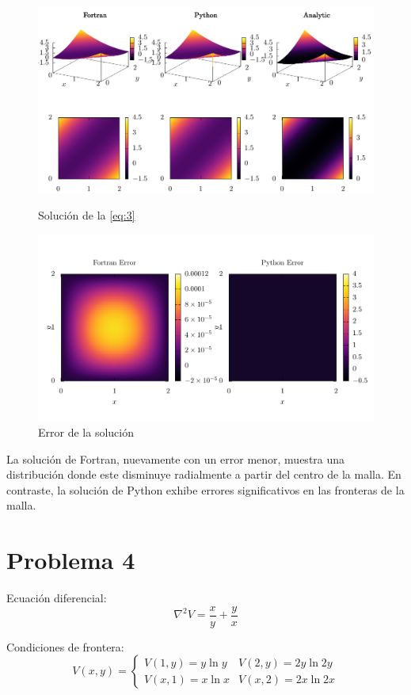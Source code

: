 \documentclass[12pt,a4paper]{article}
\begin{document}
\begin{figure}[H]
  \centering
  \includegraphics[width=\textwidth]{./comparison-03.pdf}
  \caption{Solución de la \cref{eq:3}}
  \includegraphics[width=\textwidth]{./error-03.pdf}
  \caption{Error de la solución}
\end{figure}

La solución de Fortran, nuevamente con un error menor, muestra una distribución
donde este disminuye radialmente a partir del centro de la malla.
En contraste, la solución de Python exhibe errores significativos en las
fronteras de la malla.

\newpage

\section*{Problema 4}%
\label{sec:Problema 4}

Ecuación diferencial:
\begin{equation}
  \nabla^2{V} = \frac{x}{y} + \frac{y}{x}
  \label{eq:4}
\end{equation}

Condiciones de frontera:
\begin{equation}
  V(x, y) =
  \begin{cases}
    V(1, y) = y \ln{y} & V(2, y) = 2y \ln{2y} \\
    V(x, 1) = x \ln{x} & V(x, 2) = 2x \ln{2x}
  \end{cases}
\end{equation}
\end{document}
